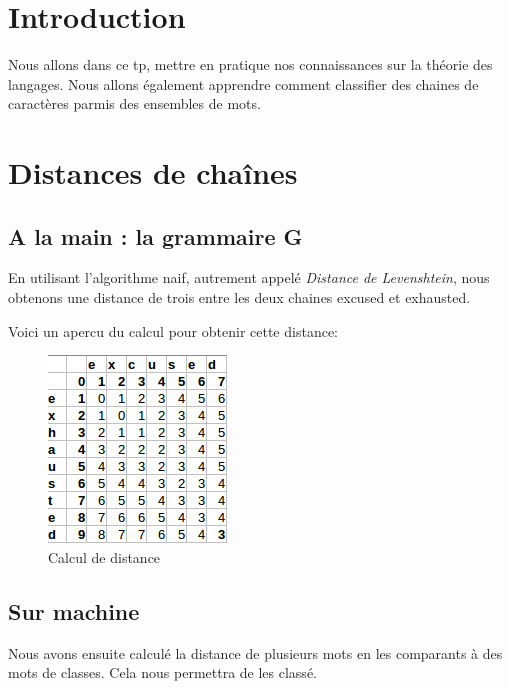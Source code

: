 \documentclass[a4paper,12pt]{report}
\begin{document}


\setcounter{page}{1} 
\newpage

\section*{Introduction}

Nous allons dans ce tp, mettre en pratique nos connaissances sur la théorie des langages. Nous allons également apprendre comment classifier des chaines de caractères parmis des ensembles de mots.


\section*{Distances de chaînes}
\subsection*{A la main : la grammaire G}

En utilisant l'algorithme naif, autrement appelé \textit{Distance de Levenshtein}, nous obtenons une distance de trois entre les deux chaines excused et exhausted. 

Voici un apercu du calcul pour obtenir cette distance:

\begin{figure}[!ht]
	\center
	\includegraphics[scale=0.6]{image/q1.png}
	\caption{Calcul de distance}
	\label{fig1}
\end{figure}

\subsection*{Sur machine}
Nous avons ensuite calculé la distance de plusieurs mots en les comparants à des mots de classes. Cela nous permettra de les classé.
\end{document}
